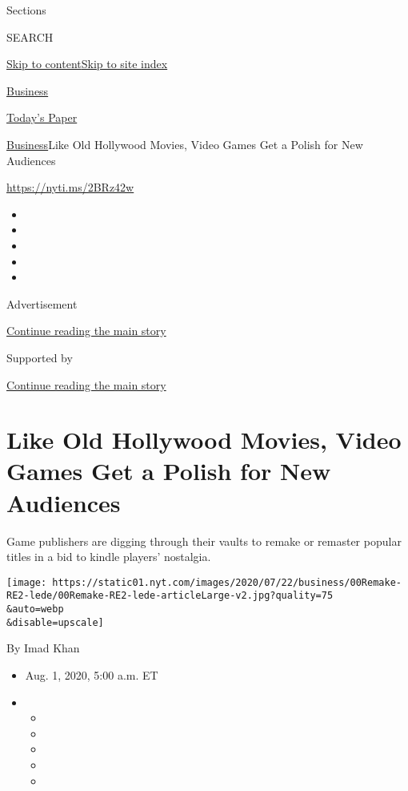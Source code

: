 Sections

SEARCH

\protect\hyperlink{site-content}{Skip to
content}\protect\hyperlink{site-index}{Skip to site index}

\href{https://www.nytimes.com/section/business}{Business}

\href{https://myaccount.nytimes.com/auth/login?response_type=cookie\&client_id=vi}{}

\href{https://www.nytimes.com/section/todayspaper}{Today's Paper}

\href{/section/business}{Business}\textbar{}Like Old Hollywood Movies,
Video Games Get a Polish for New Audiences

\url{https://nyti.ms/2BRz42w}

\begin{itemize}
\item
\item
\item
\item
\item
\end{itemize}

Advertisement

\protect\hyperlink{after-top}{Continue reading the main story}

Supported by

\protect\hyperlink{after-sponsor}{Continue reading the main story}

\hypertarget{like-old-hollywood-movies-video-games-get-a-polish-for-new-audiences}{%
\section{Like Old Hollywood Movies, Video Games Get a Polish for New
Audiences}\label{like-old-hollywood-movies-video-games-get-a-polish-for-new-audiences}}

Game publishers are digging through their vaults to remake or remaster
popular titles in a bid to kindle players' nostalgia.

\texttt{[image: https://static01.nyt.com/images/2020/07/22/business/00Remake-RE2-lede/00Remake-RE2-lede-articleLarge-v2.jpg?quality=75\\\&auto=webp\\\&disable=upscale]}

By Imad Khan

\begin{itemize}
\item
  Aug. 1, 2020, 5:00 a.m. ET
\item
  \begin{itemize}
  \item
  \item
  \item
  \item
  \item
  \end{itemize}
\end{itemize}

